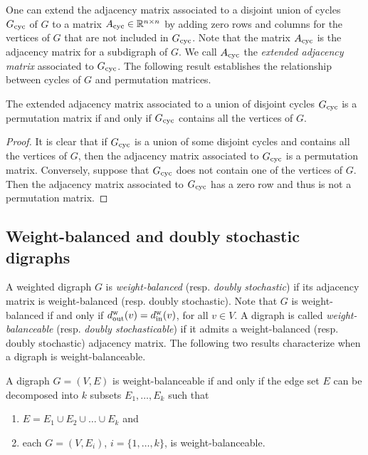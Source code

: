 \documentclass[final]{siamltex}
\begin{document}
One can extend the adjacency matrix associated to a disjoint union of
cycles $ {{G}_{\textup{{cyc}}}}$ of $G$ to a matrix $ {{A}_{\textup{{cyc}}}}\in
\mathbb{R}^{n\times n}$ by adding zero rows and columns for the
vertices of $ G $ that are not included in $ {{G}_{\textup{{cyc}}}} $. Note
that the matrix $ {{A}_{\textup{{cyc}}}} $ is the adjacency matrix for a
subdigraph of $ G $. We call $ {{A}_{\textup{{cyc}}}}$ the \emph{extended
  adjacency matrix} associated to $ {{G}_{\textup{{cyc}}}} $.  The following
result establishes the relationship between cycles of $ G $ and
permutation matrices.
\begin{lemma}\label{lemma:perm_cycle}
  The extended adjacency matrix associated to a union of disjoint
  cycles $ {{G}_{\textup{{cyc}}}} $ is a permutation matrix if and only if $
  {{G}_{\textup{{cyc}}}} $ contains all the vertices of $ G $.
\end{lemma}
\begin{proof}
  It is clear that if $ {{G}_{\textup{{cyc}}}} $ is a union of some disjoint
  cycles and contains all the vertices of $ G $, then the adjacency
  matrix associated to $ {{G}_{\textup{{cyc}}}} $ is a permutation
  matrix. Conversely, suppose that $ {{G}_{\textup{{cyc}}}} $ does not
  contain one of the vertices of $G$. Then the adjacency matrix
  associated to $ {{G}_{\textup{{cyc}}}} $ has a zero row and thus is not a
  permutation matrix.
\end{proof}

\subsection{Weight-balanced and doubly stochastic digraphs}

A weighted digraph $G$ is \emph{weight-balanced} (resp. \emph{doubly
  stochastic}) if its adjacency matrix is weight-balanced
(resp. doubly stochastic). Note that $ G $ is weight-balanced if and
only if $ {{{d}_{\textup{{out}}}^{\textup{{w}}}}}(v) ={{{d}_{\textup{{in}}}^{\textup{{w}}}}}(v) $, for all $ v \in V $.
A digraph is called \emph{weight-balanceable} (resp. \emph{doubly
  stochasticable}) if it admits a weight-balanced (resp. doubly
stochastic) adjacency matrix.  The following two results characterize
when a digraph is weight-balanceable.

\begin{theorem}\label{Theorem:Theorem_1_Loh}
  A digraph $ G=(V,E) $ is weight-balanceable if and only if the edge set
  $ E $ can be decomposed into $ k $ subsets $ E_1,\ldots, E_k $ such
  that 
  \begin{enumerate}
  \item $ E=E_1\cup E_2\cup \ldots \cup E_k $ and
  \item each $ G=(V,E_i) $, $ i=\{1,\ldots, k\} $, is
    weight-balanceable.
  \end{enumerate}
\end{theorem}
\end{document}
